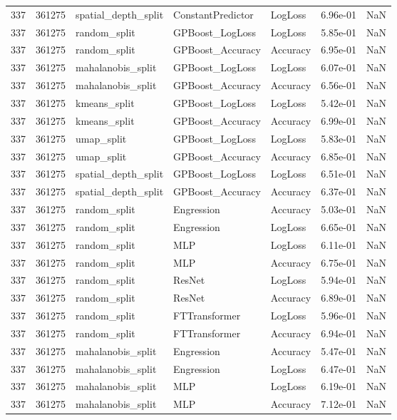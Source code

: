 \begin{tabular}{rrlllrr}
337 & 361275 & spatial\_depth\_split & ConstantPredictor & LogLoss & 6.96e-01 & NaN \\
337 & 361275 & random\_split & GPBoost\_LogLoss & LogLoss & 5.85e-01 & NaN \\
337 & 361275 & random\_split & GPBoost\_Accuracy & Accuracy & 6.95e-01 & NaN \\
337 & 361275 & mahalanobis\_split & GPBoost\_LogLoss & LogLoss & 6.07e-01 & NaN \\
337 & 361275 & mahalanobis\_split & GPBoost\_Accuracy & Accuracy & 6.56e-01 & NaN \\
337 & 361275 & kmeans\_split & GPBoost\_LogLoss & LogLoss & 5.42e-01 & NaN \\
337 & 361275 & kmeans\_split & GPBoost\_Accuracy & Accuracy & 6.99e-01 & NaN \\
337 & 361275 & umap\_split & GPBoost\_LogLoss & LogLoss & 5.83e-01 & NaN \\
337 & 361275 & umap\_split & GPBoost\_Accuracy & Accuracy & 6.85e-01 & NaN \\
337 & 361275 & spatial\_depth\_split & GPBoost\_LogLoss & LogLoss & 6.51e-01 & NaN \\
337 & 361275 & spatial\_depth\_split & GPBoost\_Accuracy & Accuracy & 6.37e-01 & NaN \\
337 & 361275 & random\_split & Engression & Accuracy & 5.03e-01 & NaN \\
337 & 361275 & random\_split & Engression & LogLoss & 6.65e-01 & NaN \\
337 & 361275 & random\_split & MLP & LogLoss & 6.11e-01 & NaN \\
337 & 361275 & random\_split & MLP & Accuracy & 6.75e-01 & NaN \\
337 & 361275 & random\_split & ResNet & LogLoss & 5.94e-01 & NaN \\
337 & 361275 & random\_split & ResNet & Accuracy & 6.89e-01 & NaN \\
337 & 361275 & random\_split & FTTransformer & LogLoss & 5.96e-01 & NaN \\
337 & 361275 & random\_split & FTTransformer & Accuracy & 6.94e-01 & NaN \\
337 & 361275 & mahalanobis\_split & Engression & Accuracy & 5.47e-01 & NaN \\
337 & 361275 & mahalanobis\_split & Engression & LogLoss & 6.47e-01 & NaN \\
337 & 361275 & mahalanobis\_split & MLP & LogLoss & 6.19e-01 & NaN \\
337 & 361275 & mahalanobis\_split & MLP & Accuracy & 7.12e-01 & NaN \\

\end{tabular}
